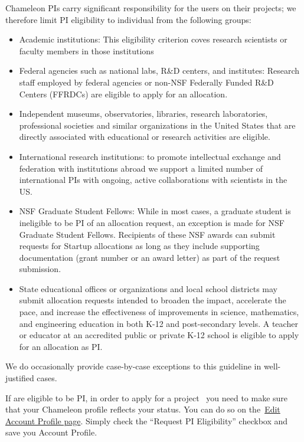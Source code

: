 Chameleon PIs carry significant responsibility for the users on their
projects; we therefore limit PI eligibility to individual from the
following groups:

\begin{itemize}

\item
  Academic institutions: This eligibility criterion coves research
  scientists or faculty members in those institutions
\item
  Federal agencies such as national labs, R\&D centers, and institutes:
  Research staff employed by federal agencies or non-NSF Federally
  Funded R\&D Centers (FFRDCs) are eligible to apply for an allocation.
\item
  Independent museums, observatories, libraries, research laboratories,
  professional societies and similar organizations in the United States
  that are directly associated with educational or research activities
  are eligible.
\item
  International research institutions: to promote intellectual exchange
  and federation with institutions abroad we support a limited number of
  international PIs with ongoing, active collaborations with scientists
  in the US.~
\item
  NSF Graduate Student Fellows: While in most cases, a graduate student
  is ineligible to be PI of an allocation request, an exception is made
  for NSF Graduate Student Fellows. Recipients of these NSF awards can
  submit requests for Startup allocations as long as they include
  supporting documentation (grant number or an award letter) as part of
  the request submission.
\item
  State educational offices or organizations and local school districts
  may submit allocation requests intended to broaden the impact,
  accelerate the pace, and increase the effectiveness of improvements in
  science, mathematics, and engineering education in both K-12 and
  post-secondary levels. A teacher or educator at an accredited public
  or private K-12 school is eligible to apply for an allocation as PI.
\end{itemize}

We do occasionally provide case-by-case exceptions to this guideline in
well-justified cases.~

If are eligible to be PI, in order to apply for a project ~you need to
make sure that your Chameleon profile reflects your status. You can do
so on the~\href{https://www.chameleoncloud.org/user/profile/edit}{Edit
Account Profile page}. Simply check the ``Request PI Eligibility''
checkbox and save you Account Profile.

